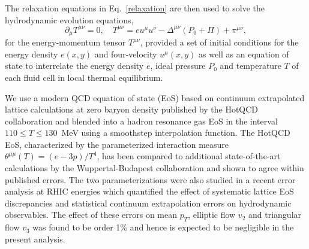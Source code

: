 \documentclass[aps,prc,reprint,amsmath,nofootinbib]{revtex4-1}
\begin{document}
The relaxation equations in Eq.~\eqref{relaxation} are then used to solve the hydrodynamic evolution equations,
\begin{equation}
    \label{conservation}
    \partial_\mu T^{\mu\nu} = 0, \quad T^{\mu\nu} = e u^\mu u^\nu  - \Delta^{\mu\nu} (P_0 + \Pi) + \pi^{\mu\nu},
\end{equation}
for the energy-momentum tensor $T^{\mu\nu}$, provided a set of initial conditions for the energy density $e(x,y)$ and four-velocity $u^\mu(x,y)$ as well as an equation of state to interrelate the energy density $e$, ideal pressure $P_0$ and temperature $T$ of each fluid cell in local thermal equilibrium.

We use a modern QCD equation of state (EoS) based on continuum extrapolated lattice calculations at zero baryon density published by the HotQCD collaboration and blended into a hadron resonance gas EoS in the interval $110 \le T \le 130$~MeV using a smoothstep interpolation function.
The HotQCD EoS, characterized by the parameterized interaction measure $\theta^{\mu\mu}(T) = (e - 3p)/T^4$, has been compared to additional state-of-the-art calculations by the Wuppertal-Budapest collaboration and shown to agree within published errors.
The two parameterizations were also studied in a recent error analysis at RHIC energies which quantified the effect of systematic lattice EoS discrepancies and statistical continuum extrapolation errors on hydrodynamic observables.
The effect of these errors on mean $p_T$, elliptic flow $v_2$ and triangular flow $v_3$ was found to be order 1\% and hence is expected to be negligible in the present analysis.
\end{document}
